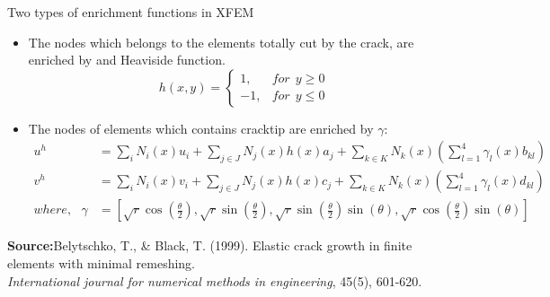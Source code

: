 \documentclass{beamer}
\begin{document}
\begin{frame}[t,fragile]{Two types of enrichment functions in XFEM}
    \vspace{-.3cm}
     \footnotesize
    \begin{itemize}
        \item The nodes which belongs to the elements totally cut by the crack, are enriched by and Heaviside function.
    $$h(x,y)=\begin{cases}1,&       for ~ ~ y\ge 0\\ -1,&       for~ ~ y\le 0\end{cases}$$
\item The nodes of elements which contains cracktip are enriched by $\gamma$:
     \footnotesize
    \begin{align*}
    u^h&=\sum_i N_i(x)u_i+\sum_{j\in J} N_j(x) h(x)a_j+\sum_{k\in K} N_k(x)\left( \sum_{l=1}^{4}\gamma_l(x)b_{kl} \right) \\
    v^h&=\sum_i N_i(x)v_i+\sum_{j\in J} N_j(x) h(x)c_j+\sum_{k\in K} N_k(x)\left( \sum_{l=1}^{4}\gamma_l(x)d_{kl} \right) \\ 
    where,\ \ \ \gamma&=\left[ \sqrt{r}\cos \left( \frac{\theta}{2} \right), \sqrt{r}\sin\left( \frac{\theta}{2} \right),\sqrt{r}\sin\left( \frac{\theta}{2} \right)\sin(\theta),\sqrt{r}\cos\left( \frac{\theta}{2} \right)\sin(\theta)\right] 
\end{align*}
\end{itemize}
\tiny
\hspace{10pt}
\textbf{Source:}Belytschko, T., \& Black, T. (1999). Elastic crack growth in finite elements with minimal remeshing. \\
\vspace{-7pt}
\hspace{10pt}
\emph{International journal for numerical methods in engineering}, 45(5), 601-620.
\end{frame}
\end{document}
